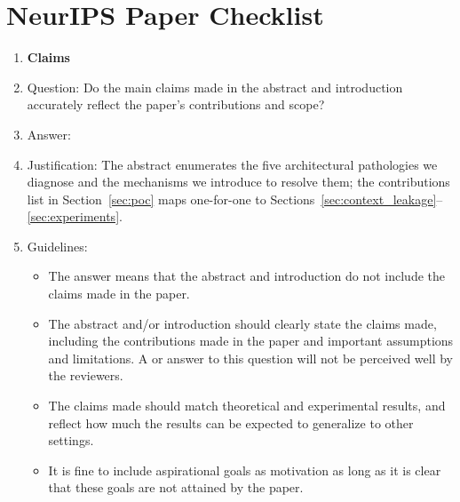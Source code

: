 \section*{NeurIPS Paper Checklist}

\begin{enumerate}

\item {\bf Claims}
    \item[] Question: Do the main claims made in the abstract and introduction accurately reflect the paper's contributions and scope?
    \item[] Answer: \answerYes{}
    \item[] Justification: The abstract enumerates the five architectural pathologies we diagnose and the mechanisms we introduce to resolve them; the contributions list in Section~\ref{sec:poc} maps one-for-one to Sections~\ref{sec:context_leakage}--\ref{sec:experiments}.
    \item[] Guidelines:
    \begin{itemize}
        \item The answer \answerNA{} means that the abstract and introduction do not include the claims made in the paper.
        \item The abstract and/or introduction should clearly state the claims made, including the contributions made in the paper and important assumptions and limitations. A \answerNo{} or \answerNA{} answer to this question will not be perceived well by the reviewers.
        \item The claims made should match theoretical and experimental results, and reflect how much the results can be expected to generalize to other settings.
        \item It is fine to include aspirational goals as motivation as long as it is clear that these goals are not attained by the paper.
    \end{itemize}


\end{enumerate}
